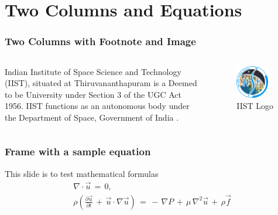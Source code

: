 \documentclass[hyperref={bookmarks=false},aspectratio=169]{beamer}
\begin{document}
\section{Two Columns and Equations}
\begin{frame}
\frametitle{Two Columns with Footnote and Image}

\begin{columns}

Indian Institute of Space Science and Technology (IIST), situated at Thiruvananthapuram is a Deemed to be University under Section 3 of the UGC Act 1956. IIST functions as an autonomous body under the Department of Space, Government of India \footnotemark[1]. 

\begin{figure}
  \includegraphics[width=0.8\textwidth]{figures/Indian_Institute_of_Space_Science_and_Technology_Logo.png}
  \caption{IIST Logo}
  \label{fig:iistlogo}
\end{figure}
\end{columns}
\end{frame}

\begin{frame}
  \frametitle{Frame with a sample equation}
  This slide is to test mathematical formulas \pause
  \begin{equation}
    \begin{gathered}
        \nabla \cdot \vec{u}\, = \,0,\\
        \rho\left(\frac{\partial\vec{u}}{\partial t} \,+\,\vec{u} \cdot \nabla \vec{u}\right)\, =\, -\, \nabla P\, + \,\mu \,\nabla^2 \vec{u}\, +\, \rho\vec{f}
    \end{gathered}
  \end{equation}
\end{frame}
\end{document}
